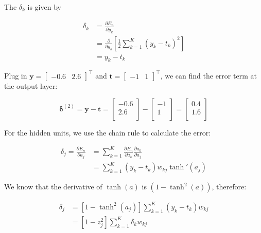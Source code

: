 \begin{solution}
     The $\delta_k$ is given by

    \[
        \begin{align*}
            \delta_k
            &= \frac{\partial E_n}{\partial y_k} \\
            &= \frac{\partial}{\partial y_k}{ \left[ \frac{1}{2}\sum_{k=1}^{K}(y_k - t_k)^2 \right] } \\
            &= y_k - t_k
        \end{align*}
    \]

    Plug in $\mathbf{y} = \begin{bmatrix}
                              -0.6 & 2.6
    \end{bmatrix}^\intercal$ and $\mathbf{t} = \begin{bmatrix}
                                                   -1 & 1
    \end{bmatrix}^\intercal$, we can find the error term at the output layer:

    \[
        \bm{\delta}^{(2)} =
        \mathbf{y} - \mathbf{t} =
        \begin{bmatrix}
            -0.6 \\
            2.6  \\
        \end{bmatrix}
        -
        \begin{bmatrix}
            -1 \\
            1  \\
        \end{bmatrix}
        =
        \begin{bmatrix}
            0.4 \\
            1.6 \\
        \end{bmatrix}
    \]

    For the hidden units, we use the chain rule to calculate the error:

    \[
        \begin{align*}
            \delta_j
            = \frac{\partial E_n}{\partial a_j}
            &= \sum_{k = 1}^{K}{ \frac{\partial E_n}{\partial a_k}\frac{\partial a_k}{\partial a_j} }\\
            &= \sum_{k = 1}^{K} { (y_k - t_k)w_{kj}\tanh'(a_j) }
        \end{align*}
    \]

    We know that the derivative of $\tanh(a)$ is $(1 - \tanh^2(a))$, therefore:

    \[
        \begin{align*}
            \delta_j
            &= [1 - \tanh^2(a_j)] \sum_{k = 1}^{K} { (y_k - t_k)w_{kj} } \\
            &= [1 - z_j^2] \sum_{k = 1}^{K} { \delta_k w_{kj} }
        \end{align*}
    \]


\end{solution}
